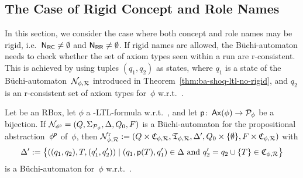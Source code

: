 \subsection{The Case of Rigid Concept and Role Names}\label{sec:ba-rigid}

In this section, we consider the case where both concept and role names may be
rigid, i.e.~$\mathsf{N_{RC}}\ne\emptyset$ and $\mathsf{N_{RR}}\ne\emptyset$.
%
If rigid names are allowed, the Büchi-automaton needs to check whether the set
of axiom types seen within a run are r-consistent.  This is achieved by using
tuples $(q_1,q_2)$ as states, where $q_1$ is a state of the
Büchi-automaton~$\mathcal{N}_{\phi,\mathcal{R}}$ introduced in
Theorem~\ref{thm:ba-shoq-ltl-no-rigid}, and $q_2$ is an r-consistent set of
axiom types for~$\phi$ w.r.t.~\Rmc.

\begin{theorem}\label{thm:ba-for-shoq-ltl-rigid}
    Let \Rmc be an RBox, let $\phi$ a \SHOQ-LTL-formula w.r.t.~\Rmc, and let
    $\mathsf{p}\colon\operatorname{\mathsf{Ax}}(\phi)\to\mathcal{P}_\phi$ be a bijection.
    If $\mathcal{N}_{\phi^\mathsf{p}}=(Q,\Sigma_{\mathcal{P}_\phi},\Delta,Q_0,F)$ is a
    Büchi-automaton for the propositional abstraction~$\phi^\mathsf{p}$ of~$\phi$,
    then
    $\mathcal{N}_{\phi,\mathcal{R}}^\text{r}:=(Q\times\mathfrak{C}_{\phi,\mathcal{R}},\mathfrak{T}_{\phi,\mathcal{R}},\Delta',Q_0\times\{\emptyset\},F\times\mathfrak{C}_{\phi,\mathcal{R}})$
    with
    \[\Delta':=\bigl\{((q_1,q_2),T,(q_1',q_2'))\mid%
        (q_1,\psf(T),q_1')\in\Delta\ \text{and}\ q_2'=q_2\cup\{T\}\in\Cmf_{\phi,\Rmc}\bigr\}\]
    is a Büchi-automaton for~$\phi$ w.r.t.~\Rmc.
\end{theorem}


